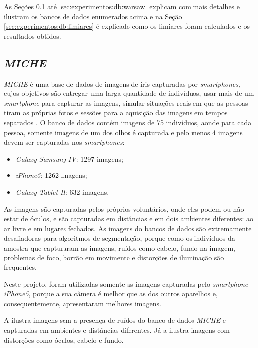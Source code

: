 \par As Seções \ref{sec:experimentos:db:miche} até \ref{sec:experimentos:db:warsaw} explicam com mais detalhes e ilustram os bancos de dados enumerados acima e na Seção \ref{sec:experimentos:db:limiares} é explicado como os limiares foram calculados e os resultados obtidos.

\subsection{\textit{MICHE}}\label{sec:experimentos:db:miche}

\par \textit{MICHE} é uma base de dados de imagens de íris capturadas por \textit{smartphones}, cujos objetivos são entregar uma larga quantidade de indivíduos, usar mais de um \textit{smartphone} para capturar as imagens, simular situações reais em que as pessoas tiram as próprias fotos e sessões para a aquisição das imagens em tempos separados \cite{santada2016-MICHE-2}. O banco de dados contém imagens de 75 indivíduos, aonde para cada pessoa, somente imagens de um dos olhos é capturada e pelo menos 4 imagens devem ser capturadas nos \textit{smartphones}:

\begin{itemize}
    \item \textit{Galaxy Samsung IV}: 1297 imagens;
    \item \textit{iPhone5}: 1262 imagens;
    \item \textit{Galaxy Tablet II}: 632 imagens.
\end{itemize}

\par As imagens são capturadas pelos próprios voluntários, onde eles podem ou não estar de óculos, e são capturadas em distâncias e em dois ambientes diferentes: ao ar livre e em lugares fechados. As imagens do bancos de dados são extremamente desafiadoras para algoritmos de segmentação, porque como os indivíduos da amostra que capturaram as imagens, ruídos como cabelo, fundo na imagem, problemas de foco, borrão em movimento e distorções de iluminação são frequentes.

\par Neste projeto, foram utilizadas somente as imagens capturadas pelo \textit{smartphone} \textit{iPhone5}, porque a sua câmera é melhor que as dos outros aparelhos e, consequentemente, apresentaram melhores imagens.

\par A  ilustra imagens sem a presença de ruídos do banco de dados \textit{MICHE} e capturadas em ambientes e distâncias diferentes. Já a  ilustra imagens com distorções como óculos, cabelo e fundo.

